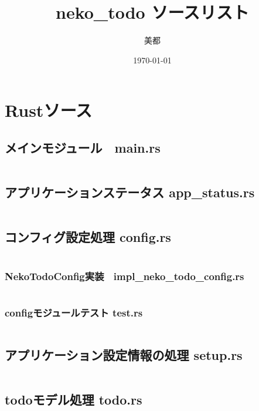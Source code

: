 \documentclass[paper=a4paper, fontsize=10pt, head_space=10mm, foot_space=17mm, gutter=17mm, line_length=185mm, twoside]{jlreq}
\title{neko\_todo ソースリスト}
\author{美都}
\date{\today}
\begin{document}
\maketitle
\tableofcontents
\clearpage

\section{Rustソース}
\subsection{メインモジュール　main.rs}
\inputminted[linenos, breaklines]{rust}{src-rs/main.rs}
\clearpage
\subsection{アプリケーションステータス app\_status.rs}
\inputminted[linenos, breaklines]{rust}{src-rs/app_status.rs}
\clearpage

\subsection{コンフィグ設定処理 config.rs}
\inputminted[linenos, breaklines]{rust}{src-rs/config.rs}
\clearpage

\subsubsection{NekoTodoConfig実装　impl\_neko\_todo\_config.rs}
\inputminted[linenos, breaklines]{rust}{src-rs/config/impl_neko_todo_config.rs}
\clearpage

\subsubsection{configモジュールテスト test.rs}
\inputminted[linenos, breaklines]{rust}{src-rs/config/test.rs}
\clearpage

\subsection{アプリケーション設定情報の処理 setup.rs}
\inputminted[linenos, breaklines]{rust}{src-rs/setup.rs}
\clearpage

\subsection{todoモデル処理 todo.rs}
\inputminted[linenos, breaklines]{rust}{src-rs/todo.rs}
\clearpage
\end{document}
